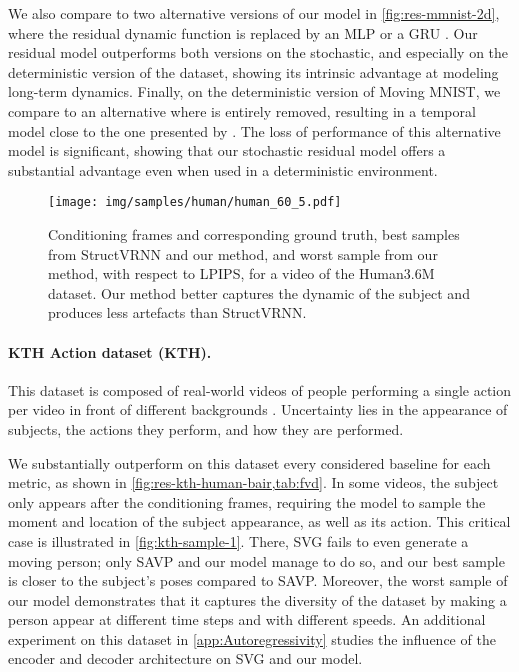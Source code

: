 \documentclass{article}
\begin{document}
We also compare to two alternative versions of our model in \cref{fig:res-mmnist-2d}, where the residual dynamic function is replaced by an MLP or a GRU \citep[Gated Recurrent Unit,][]{Cho2014}.
Our residual model outperforms both versions on the stochastic, and especially on the deterministic version of the dataset, showing its intrinsic advantage at modeling long-term dynamics.
Finally, on the deterministic version of Moving MNIST, we compare to an alternative where  is entirely removed, resulting in a temporal model close to the one presented by \citet{Chen2018}.
The loss of performance of this alternative model is significant, showing that our stochastic residual model offers a substantial advantage even when used in a deterministic environment.

\begin{figure*}
    \centering
    \texttt{[image: img/samples/human/human\_60\_5.pdf]}
    \vspace{-0.03in}
    \caption{
        \label{fig:human-sample-1}
        Conditioning frames and corresponding ground truth, best samples from StructVRNN and our method, and worst sample from our method, with respect to LPIPS, for a video of the Human3.6M dataset.
        Our method better captures the dynamic of the subject and produces less artefacts than StructVRNN.
    }
    \vspace{-0.13in}
\end{figure*}
 
\paragraph{KTH Action dataset (KTH).}

This dataset is composed of real-world videos of people performing a single action per video in front of different backgrounds \citep{Schuldt2004}.
Uncertainty lies in the appearance of subjects, the actions they perform, and how they are performed.

We substantially outperform on this dataset every considered baseline for each metric, as shown in \cref{fig:res-kth-human-bair,tab:fvd}.
In some videos, the subject only appears after the conditioning frames, requiring the model to sample the moment and location of the subject appearance, as well as its action.
This critical case is illustrated in \cref{fig:kth-sample-1}.
There, SVG fails to even generate a moving person; only SAVP and our model manage to do so, and our best sample is closer to the subject's poses compared to SAVP.
Moreover, the worst sample of our model demonstrates that it captures the diversity of the dataset by making a person appear at different time steps and with different speeds.
An additional experiment on this dataset in \cref{app:Autoregressivity} studies the influence of the encoder and decoder architecture on SVG and our model.
\end{document}
